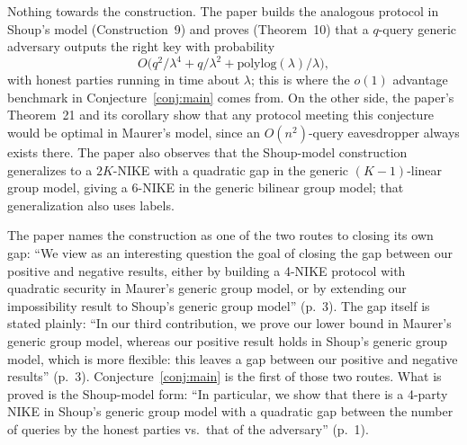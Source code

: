 \documentclass{conjura-conjecture}
\newcommand{\polylog}{\mathrm{polylog}}
\begin{document}
\begin{remark}\label{rem:progress}
Nothing towards the construction. The paper builds the analogous
protocol in Shoup's model (Construction~9) and proves (Theorem~10) that
a $q$-query generic adversary outputs the right key with probability
\[
  O\bigl(q^{2}/\lambda^{4} + q/\lambda^{2}
  + \polylog(\lambda)/\lambda\bigr),
\]
with honest parties running in time about $\lambda$; this is where the
$o(1)$ advantage benchmark in Conjecture~\ref{conj:main} comes from. On
the other side, the paper's Theorem~21 and its corollary show that any
protocol meeting this conjecture would be optimal in Maurer's model,
since an $O(n^{2})$-query eavesdropper always exists there. The paper
also observes that the Shoup-model construction generalizes to a
$2K$-NIKE with a quadratic gap in the generic $(K-1)$-linear group
model, giving a 6-NIKE in the generic bilinear group model; that
generalization also uses labels.
\end{remark}

\begin{remark}[Openness]\label{rem:open}
The paper names the construction as one of the two routes to closing its
own gap: ``We view as an interesting question the goal of closing the
gap between our positive and negative results, either by building a
4-NIKE protocol with quadratic security in Maurer's generic group model,
or by extending our impossibility result to Shoup's generic group
model'' (p.~3). The gap itself is stated plainly: ``In our third
contribution, we prove our lower bound in Maurer's generic group model,
whereas our positive result holds in Shoup's generic group model, which
is more flexible: this leaves a gap between our positive and negative
results'' (p.~3). Conjecture~\ref{conj:main} is the first of those two
routes. What is proved is the Shoup-model form: ``In particular, we show
that there is a 4-party NIKE in Shoup's generic group model with a
quadratic gap between the number of queries by the honest parties
vs.\ that of the adversary'' (p.~1).
\end{remark}
\end{document}
